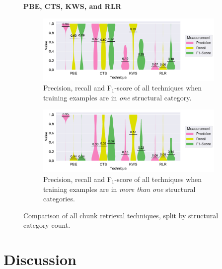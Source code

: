 \begin{figure}
\centering
    \textbf{PBE, CTS, KWS, and RLR}\par\medskip
\begin{subfigure}[b]{\columnwidth}
		\centering
				\includegraphics[width=\columnwidth,
				clip]{img/big-study/recall-precision-singlecategory-all.pdf}
		\caption{Precision, recall and F$_{1}$-score of all
		techniques when training examples are in \emph{one}
		structural category.}
		\label{fig:recall-precision-singlecategory-all}
\end{subfigure}\hspace{\fill}
\begin{subfigure}[b]{\columnwidth}
		\centering
				\centering
		\includegraphics[width=\columnwidth,
		clip]{img/big-study/recall-precision-multicategory-all.pdf}
		\caption{Precision, recall and F$_{1}$-score of all
		techniques when training examples are in \emph{more than
		one} structural categories.}
		\label{fig:recall-precision-multicategory-all}
\end{subfigure}
\caption{Comparison of all chunk retrieval techniques, split by structural
category count.}
\end{figure}

\section{Discussion}
\label{sec:discussion}


